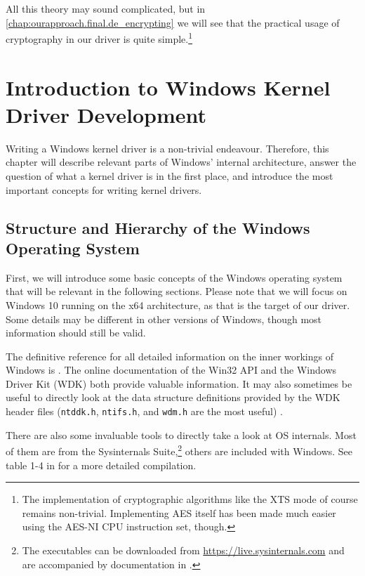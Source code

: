 All this theory may sound complicated, but in \autoref{chap:ourapproach.final.de_encrypting} we will see that the practical usage of cryptography in our driver is quite simple.\footnote{\label{fn:background.luks2.simplecryptography} The implementation of cryptographic algorithms like the XTS mode of course remains non-trivial. Implementing AES itself has been made much easier using the AES-NI CPU instruction set, though.}

\section{Introduction to Windows Kernel Driver Development}
\label{chap:background.kerneldriver}
Writing a Windows kernel driver is a non-trivial endeavour. Therefore, this chapter will describe relevant parts of Windows' internal architecture, answer the question of what a kernel driver is in the first place, and introduce the most important concepts for writing kernel drivers.

\subsection{Structure and Hierarchy of the Windows Operating System}
\label{chap:background.kerneldriver.oshierarchy}
First, we will introduce some basic concepts of the Windows operating system that will be relevant in the following sections. Please note that we will focus on Windows 10 running on the x64 architecture, as that is the target of our driver. Some details may be different in other versions of Windows, though most information should still be valid.

The definitive reference for all detailed information on the inner workings of Windows is \cite{Yosifovich2017}. The online documentation of the Win32 API \cite{Win32} and the Windows Driver Kit (WDK) \cite{Wdk} both provide valuable information. It may also sometimes be useful to directly look at the data structure definitions provided by the WDK header files (\texttt{ntddk.h}, \texttt{ntifs.h}, and \texttt{wdm.h} are the most useful) \cite{Yosifovich2017}.

There are also some invaluable tools to directly take a look at OS internals. Most of them are from the Sysinternals Suite,\footnote{\label{fn:background.kerneldriver.sysinternals} The executables can be downloaded from \url{https://live.sysinternals.com} and are accompanied by documentation in \cite{Russinovich2016}.} others are included with Windows. See table 1-4 in \cite{Yosifovich2017} for a more detailed compilation.

